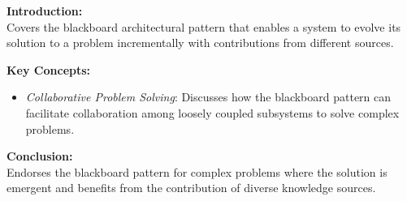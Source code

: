 \textbf{Introduction:} \\
Covers the blackboard architectural pattern that enables a system to evolve its solution to a problem incrementally with contributions from different sources.

\vspace{2mm}
\noindent\textbf{Key Concepts:}
\begin{itemize}
  \item \textit{Collaborative Problem Solving}: Discusses how the blackboard pattern can facilitate collaboration among loosely coupled subsystems to solve complex problems.
\end{itemize}

\vspace{2mm}
\noindent\textbf{Conclusion:} \\
Endorses the blackboard pattern for complex problems where the solution is emergent and benefits from the contribution of diverse knowledge sources.
